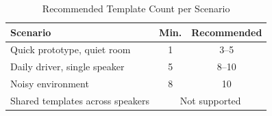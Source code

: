 \begin{table}[H]
\caption{Recommended Template Count per Scenario}
\centering
\begin{tabular}{lcc}
\toprule
\textbf{Scenario} & \textbf{Min.} & \textbf{Recommended} \\
\midrule
Quick prototype, quiet room  & 1 & 3--5  \\
Daily driver, single speaker & 5 & 8--10 \\
Noisy environment            & 8 & 10    \\
Shared templates across speakers& \multicolumn{2}{c}{Not supported} \\
\bottomrule
\end{tabular}
\label{tab:samples}
\end{table}